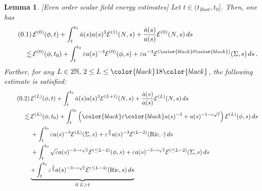 \documentclass[11pt,leqno,textwidth=10cm]{amsart}
\numberwithin{equation}{section}
\theoremstyle{definition}
\theoremstyle{plain}
\newtheorem{lemma}[definition]{Lemma}
\newcommand{\1}{\mathbbm{1}}
\newcommand{\E}{\mathcal{E}}
\newcommand{\N}{\mathbb{N}}
\newcommand{\Ric}{\text{\normalfont{Ric}}}
\renewcommand{\epsilon}{\varepsilon}
\newcommand{\Lap}{\Delta}
\newcommand{\numberthis}{\addtocounter{equation}{1}\tag{\theequation}}
\renewcommand{\theequation}{\arabic{section}.\arabic{equation}}
\newcommand{\change}[1]{\color{black}#1\color{black}}
\begin{document}
\begin{lemma}\label{lem:en-est-SF}
[\change{Even order scalar field energy estimates}] Let $t\in(t_{Boot},t_0]$. Then, one has
\begin{align*}
\numberthis\label{eq:en-est-SF0}&\,\E^{(0)}(\phi,t)+\int_t^{t_0}\dot{a}(s)a(s)^{3}\E^{(1)}(N,s)+\frac{\dot{a}(s)}{a(s)}\E^{(0)}(N,s)\,ds\\
\lesssim&\,\E^{(0)}(\phi,t_0)+\int_t^{t_0}\epsilon a(s)^{-3}\E^{(0)}(\phi,s)+\epsilon a^{-3}\E^{(\change{0})}(\Sigma,s)\,ds\,.
\end{align*}
Further, for any $L\in 2\N,\,2\leq L\leq \change{18}$, the following estimate is satisfied: 
\begin{align*}
\numberthis\label{eq:en-est-SF}&\,\E^{(L)}(\phi,t)+\int_t^{t_0}\dot{a}(s)a(s)^{3}\E^{(L+1)}(N,s)+\frac{\dot{a}(s)}{a(s)}\E^{(L)}(N,s)\,ds\\
\lesssim&\,\E^{(L)}(\phi,t_0)+\int_t^{t_0}\left(\change{\epsilon}a(s)^{-3}+a(s)^{-1-c\sqrt{\epsilon}}\right)\E^{(L)}(\phi,s)\,ds\\
&\,+\int_t^{t_0}\epsilon a(s)^{-3}\E^{(L)}(\Sigma,s)+\epsilon^\frac32 a(s)^{-3}\E^{(L-2)}(\Ric,\cdot)\,ds\\
&\,+\int_t^{t_0}\sqrt{\epsilon}a(s)^{-3-c\sqrt{\epsilon}}\E^{(\leq L-2)}(\phi,s)+\epsilon a(s)^{-3-c\sqrt{\epsilon}}\E^{(\leq L-2)}(\Sigma,s)\,ds\\
&\underbrace{+\int_t^{t_0}\epsilon^\frac32a(s)^{-3-c\sqrt{\epsilon}}\E^{(\leq L-4)}(\Ric,s)\,ds}_{\text{if }L\geq4}
\end{align*}
\end{lemma}
\end{document}
